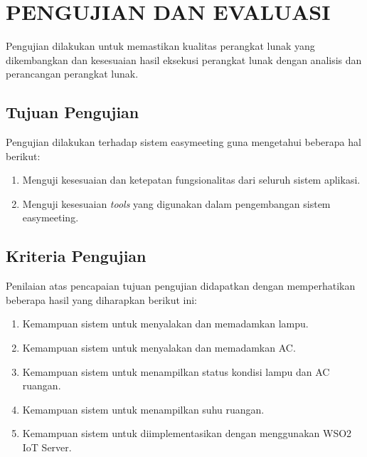 \chapter{PENGUJIAN DAN EVALUASI}
\tab Pengujian dilakukan untuk memastikan kualitas perangkat lunak yang dikembangkan dan kesesuaian hasil eksekusi perangkat lunak dengan analisis dan perancangan perangkat lunak.

\section{Tujuan Pengujian}
\tab Pengujian dilakukan terhadap sistem easymeeting guna mengetahui
beberapa hal berikut:
\begin{enumerate}
	\item Menguji kesesuaian dan ketepatan fungsionalitas dari seluruh sistem aplikasi.
	\item Menguji kesesuaian \textit{tools} yang digunakan dalam pengembangan sistem easymeeting.
\end{enumerate}

\section{Kriteria Pengujian}
\tab Penilaian atas pencapaian tujuan pengujian didapatkan dengan memperhatikan beberapa hasil yang diharapkan berikut ini:
	\begin{enumerate}
	\item Kemampuan sistem untuk menyalakan dan memadamkan lampu.
	\item Kemampuan sistem untuk menyalakan dan memadamkan AC.
	\item Kemampuan sistem untuk menampilkan status kondisi lampu dan AC ruangan.
	\item Kemampuan sistem untuk menampilkan suhu ruangan.
	\item Kemampuan sistem untuk diimplementasikan dengan menggunakan WSO2 IoT Server.
	\end{enumerate}

